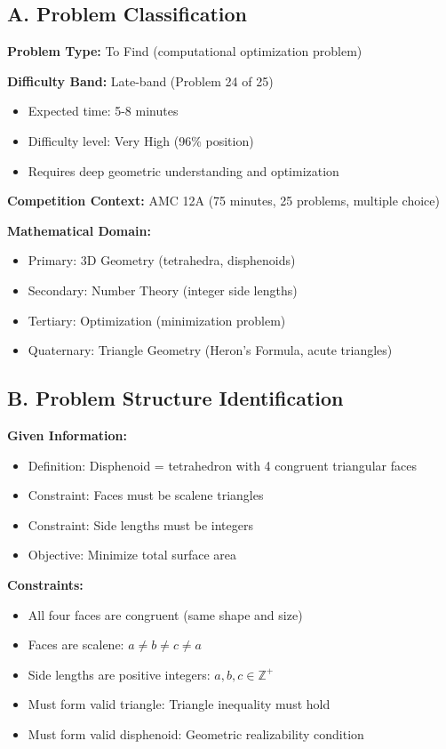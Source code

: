 \documentclass[12pt]{article}
\begin{document}
\begin{problemconfigbox}

\subsection*{A. Problem Classification}

\textbf{Problem Type:} To Find (computational optimization problem)

\textbf{Difficulty Band:} Late-band (Problem 24 of 25)
\begin{itemize}
    \item Expected time: 5-8 minutes
    \item Difficulty level: Very High (96\% position)
    \item Requires deep geometric understanding and optimization
\end{itemize}

\textbf{Competition Context:} AMC 12A (75 minutes, 25 problems, multiple choice)

\textbf{Mathematical Domain:} 
\begin{itemize}
    \item Primary: 3D Geometry (tetrahedra, disphenoids)
    \item Secondary: Number Theory (integer side lengths)
    \item Tertiary: Optimization (minimization problem)
    \item Quaternary: Triangle Geometry (Heron's Formula, acute triangles)
\end{itemize}

\subsection*{B. Problem Structure Identification}

\textbf{Given Information:}
\begin{itemize}
    \item Definition: Disphenoid = tetrahedron with 4 congruent triangular faces
    \item Constraint: Faces must be scalene triangles
    \item Constraint: Side lengths must be integers
    \item Objective: Minimize total surface area
\end{itemize}

\textbf{Constraints:}
\begin{itemize}
    \item All four faces are congruent (same shape and size)
    \item Faces are scalene: $a \neq b \neq c \neq a$
    \item Side lengths are positive integers: $a, b, c \in \mathbb{Z}^+$
    \item Must form valid triangle: Triangle inequality must hold
    \item Must form valid disphenoid: Geometric realizability condition
\end{itemize}


\end{problemconfigbox}
\end{document}
